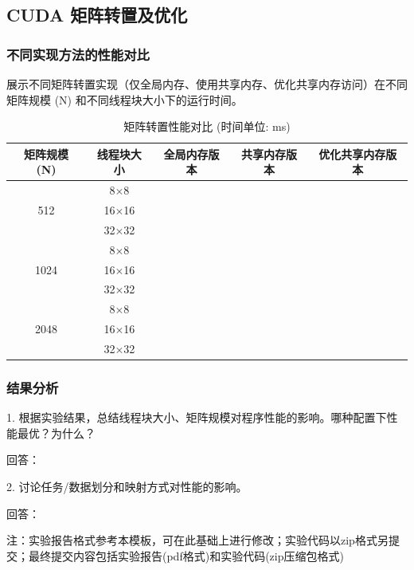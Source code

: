\documentclass{SYSUReport}
\begin{document}
\subsection{CUDA 矩阵转置及优化}
\subsubsection{不同实现方法的性能对比}
展示不同矩阵转置实现（仅全局内存、使用共享内存、优化共享内存访问）在不同矩阵规模 (N) 和不同线程块大小下的运行时间。

\begin{table}[h!]
\centering
\caption{矩阵转置性能对比 (时间单位: ms)}
\begin{tabular}{|c|c|c|c|c|}
\hline
矩阵规模 (N) & 线程块大小 & 全局内存版本 & 共享内存版本 & 优化共享内存版本 \\
\hline
\multirow{3}{*}{512} & 8$\times$8 & & & \\
\cline{2-5}
& 16$\times$16 & & & \\
\cline{2-5}
& 32$\times$32 & & & \\
\hline
\multirow{3}{*}{1024} & 8$\times$8 & & & \\
\cline{2-5}
& 16$\times$16 & & & \\
\cline{2-5}
& 32$\times$32 & & & \\
\hline
\multirow{3}{*}{2048} & 8$\times$8 & & & \\
\cline{2-5}
& 16$\times$16 & & & \\
\cline{2-5}
& 32$\times$32 & & & \\
\hline
\end{tabular}
\end{table}

\subsubsection{结果分析}
1. 根据实验结果，总结线程块大小、矩阵规模对程序性能的影响。哪种配置下性能最优？为什么？

回答：

2. 讨论任务/数据划分和映射方式对性能的影响。

回答：

注：实验报告格式参考本模板，可在此基础上进行修改；实验代码以zip格式另提交；最终提交内容包括实验报告(pdf格式)和实验代码(zip压缩包格式)
\end{document}
